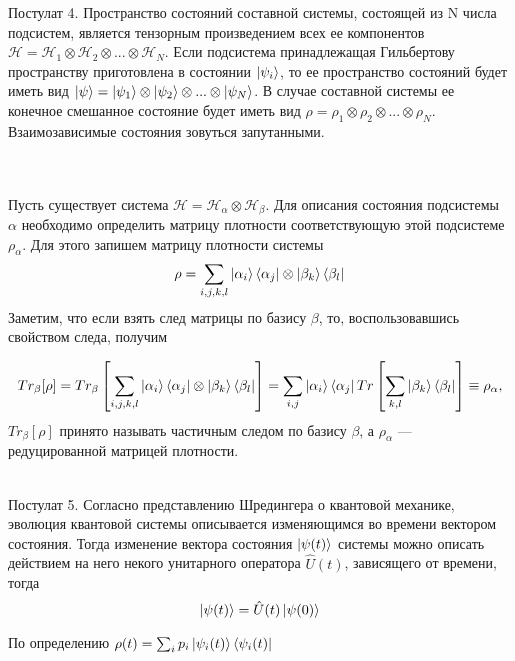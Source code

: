 \documentclass[a4paper, 10pt]{article}
\begin{document}
        \begin{itshape}
            Постулат 4. Пространство состояний составной системы, состоящей из N числа подсистем, является тензорным произведением всех ее компонентов $\mathscr{H} = \mathscr{H}_1  \otimes  \mathscr{H}_2  \otimes ... \otimes \mathscr{H}_N$. Если подсистема принадлежащая Гильбертову пространству приготовлена в состоянии $\ket{\psi_i}$, 
            то ее пространство состояний будет иметь вид $\ket{\psi} = \ket{\psi_1}  \otimes  \ket{\psi_2}  \otimes  ... \otimes  \ket{\psi_N}$. В случае составной системы ее конечное смешанное состояние будет иметь вид $\rho = \rho_1  \otimes  \rho_2  \otimes ... \otimes \rho_N$. Взаимозависимые состояния зовуться запутанными.
        \end{itshape}
        \\
        \\
        Пусть существует система $\mathscr{H} = \mathscr{H}_\alpha \otimes \mathscr{H}_\beta$. Для описания состояния подсистемы $\alpha$ необходимо определить матрицу плотности соответствующую этой подсистеме $\rho_\alpha$. Для этого запишем матрицу плотности системы 
        \begin{equation}
            \rho = \sum_{i,j,k,l} \ket{\alpha_i}\bra{\alpha_j} \otimes \ket{\beta_k} \bra{\beta_l}
        \end{equation}
        Заметим, что если взять след матрицы по базису $\beta$, то, воспользовавшись свойством следа, получим

        \begin{equation}
            Tr_\beta[\rho] = Tr_\beta\left[\sum_{i,j,k,l} \ket{\alpha_i}\bra{\alpha_j} \otimes \ket{\beta_k} \bra{\beta_l}\right] =\sum_{i,j}\ket{\alpha_i}\bra{\alpha_j} Tr\left[\sum_{k,l} \ket{\beta_k} \bra{\beta_l}\right] \equiv \rho_\alpha,
        \end{equation}
        $Tr_\beta[\rho]$ принято называть частичным следом по базису $\beta$, а $\rho_\alpha$ --- редуцированной матрицей плотности.
        \\\\
        \begin{itshape}
            Постулат 5.  Согласно представлению Шредингера о квантовой механике, эволюция квантовой системы описывается изменяющимся во времени вектором состояния. Тогда изменение вектора состояния $\ket{\psi(t)}$ системы можно описать действием на него некого унитарного оператора $\hat{U}(t)$, зависящего от времени, тогда 
            \begin{equation}
                \ket{\psi(t)} = \hat{U}(t)\ket{\psi(0)}
            \end{equation}
        \end{itshape}
       По определению $\rho(t) = \sum_{i} p_i \ket{\psi_i(t)} \bra{\psi_i(t)}$
        \newpage
\end{document}
